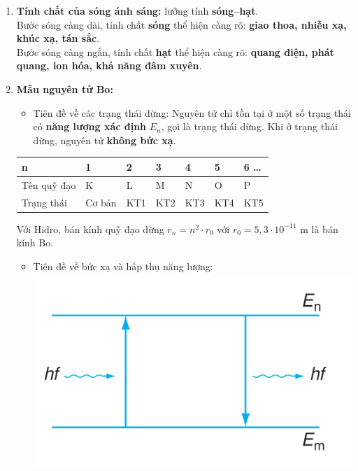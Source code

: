 \documentclass[a4paper,12pt,titlepage,twocolumn]{article}
\newenvironment{myitemize} 
{ \begin{itemize}[leftmargin=*,label=-]  %
		\setlength{\itemsep}{0pt}
		\setlength{\parskip}{0pt}
		\setlength{\parsep}{0pt}     }
{ \end{itemize}                  }
\newenvironment{myenumerate}
{ \begin{enumerate}[label=\textbf{\arabic*}.]
\setlist{nolistsep} %
\setlength{\itemsep}{0pt}
\setlength{\parskip}{0pt}
\setlength{\parsep}{0pt}	}
{ \end{enumerate}}
\begin{document}
\begin{myenumerate}
\begin{myitemize}
	\end{myitemize}
	\item \textbf{Tính chất của sóng ánh sáng:} lưỡng tính \textbf{sóng--hạt}. \\
	Bước sóng càng dài, tính chất \textbf{sóng} thể hiện càng rõ: \textbf{giao thoa, nhiễu xạ, khúc xạ, tán sắc}. \\
	Bước sóng càng ngắn, tính chất \textbf{hạt} thể hiện càng rõ: \textbf{quang điện, phát quang, ion hóa, khả năng đâm xuyên}.
	\item \textbf{Mẫu nguyên tử Bo:} 
	\begin{myitemize}
		\item Tiên đề về các trạng thái dừng: Nguyên tử chỉ tồn tại ở một số trạng thái có \textbf{năng lượng xác định}
		$E_n$, gọi là trạng thái dừng. Khi ở trạng thái dừng, nguyên tử \textbf{không bức xạ}.
	\end{myitemize}
	\begin{adjustwidth}{-0.9cm}{}
	\begin{tabular}{|m{2.4cm}|m{0.75cm}|m{0.75cm}|m{0.75cm}|m{0.75cm}|m{0.75cm}|m{1cm}|}
		\hline
		n & 1 & 2 & 3 & 4 & 5 & 6 \ldots \\ \hline
		Tên quỹ đạo & K & L & M & N & O & P \\ \hline
		Trạng thái & Cơ bản & KT1 & KT2 & KT3 & KT4 & KT5 \\ \hline	
	\end{tabular}
	\end{adjustwidth}
	Với Hidro, bán kính quỹ đạo dừng $r_n = n^2 \cdot r_0$ với $r_0 = 5,3 \cdot 10^{-11}$ \si{\meter} là bán kính Bo.
	\begin{myitemize}
		\item Tiên đề về bức xạ và hấp thụ năng lượng:
		\includegraphics[scale=0.2]{image.png}

\end{myitemize}
\end{myenumerate}
\end{document}
